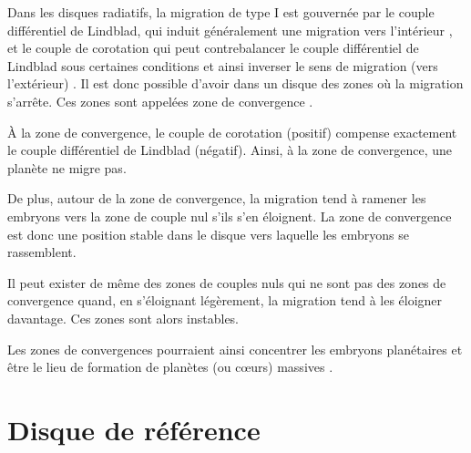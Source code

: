 Dans les disques radiatifs, la migration de type I est gouvernée par le couple différentiel de Lindblad, qui induit généralement
une migration vers l'intérieur \citep{tanaka2002three}, et le couple de corotation qui peut contrebalancer le couple
différentiel de Lindblad sous certaines conditions et ainsi inverser le sens de migration (vers l'extérieur)
\citep{paardekooper2006halting, kley2008migration}. Il est donc possible d'avoir dans un disque des zones où la migration
s'arrête. Ces zones sont appelées zone de convergence \citep[CZs;][]{lyra2010orbital, mordasini2011application,
paardekooper2011torque}. 

\bigskip

À la zone de convergence, le couple de corotation (positif) compense exactement le couple différentiel de Lindblad (négatif).
Ainsi, à la zone de convergence, une planète ne migre pas.

De plus, autour de la zone de convergence, la migration tend à ramener les embryons vers la zone de couple nul s'ils s'en
éloignent. La zone de convergence est donc une position stable dans le disque vers laquelle les embryons se rassemblent.

Il peut exister de même des zones de couples nuls qui ne sont pas des zones de convergence quand, en s'éloignant légèrement, la
migration tend à les éloigner davantage. Ces zones sont alors instables.

Les zones de convergences pourraient ainsi concentrer les embryons planétaires et être le lieu de formation de planètes (ou
cœurs) massives \citep{lyra2010orbital, horn2012orbital}. 

\section{Disque de référence}\label{sec:migrations-maps}\label{sec:reference_disk}

